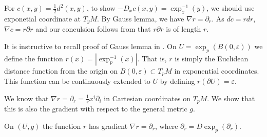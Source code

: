For \( c ( x , y ) = \frac{ 1 } { 2 } d ^ { 2 } ( x , y ) \), to show \( - D _ { x } c ( x , y ) = \exp _ { x } ^ { - 1 } ( y ) \), we should use exponetial coordinate at $T_yM$.
By Gauss lemma, we have \( \nabla r = \partial _ { r } \).
As $d c = r dr$, $\nabla c = r \partial r$ and our conculsion follows from that $ r \partial r $ is of length $r$.

It is instructive to recall proof of Gauss lemma in \cite{Petersen2016}.
On \( U = \exp _ { p } ( B ( 0 , \varepsilon ) ) \) we define the function \( r ( x ) = \left| \exp _ { p } ^ { - 1 } ( x ) \right| . \)
That is, \( r \) is simply the Euclidean distance function from the origin on \( B ( 0 , \varepsilon ) \subset T _ { p } M \) in exponential coordinates.
This function can be continuously extended to \( U \) by defining \( r ( \partial U ) = \varepsilon . \)

We know that \( \nabla r = \partial _ { r } = \frac { 1 } { r } x ^ { i } \partial _ { i } \) in Cartesian coordinates
on \( T _ { p } M . \)
We show that this is also the gradient with respect to the general metric \( g . \)

\begin{lem}
	On \( ( U , g ) \) the function \( r \) has gradient \( \nabla r = \partial _ { r } \), where \( \partial _ { r } = D \exp _ { p } \left( \partial _ { r } \right) \).
\end{lem}

